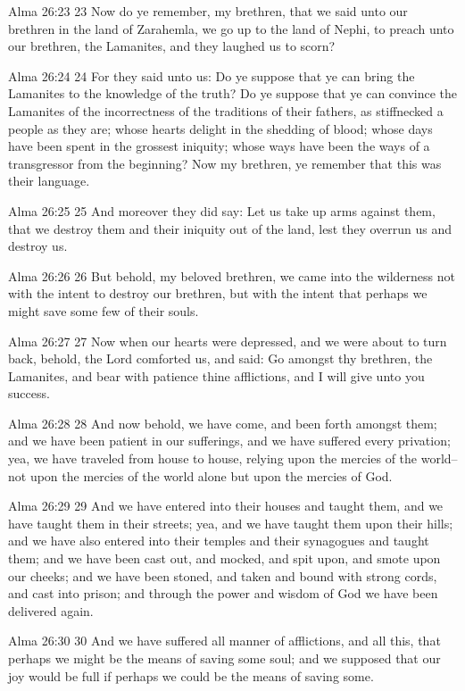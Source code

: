 Alma 26:23
 23 Now do ye remember, my brethren, that we said unto our
brethren in the land of Zarahemla, we go up to the land of Nephi,
to preach unto our brethren, the Lamanites, and they laughed us
to scorn?

Alma 26:24
 24 For they said unto us: Do ye suppose that ye can bring the
Lamanites to the knowledge of the truth? Do ye suppose that ye
can convince the Lamanites of the incorrectness of the traditions
of their fathers, as stiffnecked a people as they are; whose
hearts delight in the shedding of blood; whose days have been
spent in the grossest iniquity; whose ways have been the ways of
a transgressor from the beginning? Now my brethren, ye remember
that this was their language.

Alma 26:25
 25 And moreover they did say: Let us take up arms against them,
that we destroy them and their iniquity out of the land, lest
they overrun us and destroy us.

Alma 26:26
 26 But behold, my beloved brethren, we came into the wilderness
not with the intent to destroy our brethren, but with the intent
that perhaps we might save some few of their souls.

Alma 26:27
 27 Now when our hearts were depressed, and we were about to turn
back, behold, the Lord comforted us, and said: Go amongst thy
brethren, the Lamanites, and bear with patience thine
afflictions, and I will give unto you success.

Alma 26:28
 28 And now behold, we have come, and been forth amongst them;
and we have been patient in our sufferings, and we have suffered
every privation; yea, we have traveled from house to house,
relying upon the mercies of the world--not upon the mercies of
the world alone but upon the mercies of God.

Alma 26:29
 29 And we have entered into their houses and taught them, and we
have taught them in their streets; yea, and we have taught them
upon their hills; and we have also entered into their temples and
their synagogues and taught them; and we have been cast out, and
mocked, and spit upon, and smote upon our cheeks; and we have
been stoned, and taken and bound with strong cords, and cast into
prison; and through the power and wisdom of God we have been
delivered again.

Alma 26:30
 30 And we have suffered all manner of afflictions, and all this,
that perhaps we might be the means of saving some soul; and we
supposed that our joy would be full if perhaps we could be the
means of saving some.

